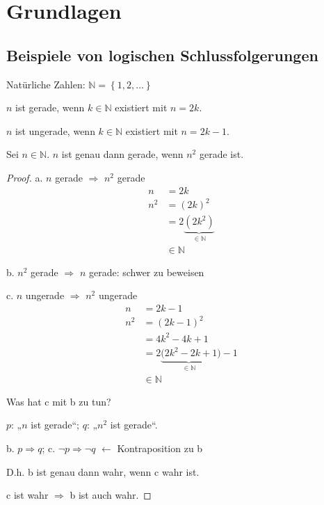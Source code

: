 
\chapter{Grundlagen}
\setcounter{section}{-1}

\section{Beispiele von logischen Schlussfolgerungen}

Natürliche Zahlen: \( \mathbb{N} = \left\{ 1, 2, \dots \right\} \)

$n$ ist gerade, wenn $k \in \mathbb{N}$ existiert mit $n = 2k$.

$n$ ist ungerade, wenn $k \in \mathbb{N}$ existiert mit $n = 2k-1$.

\begin{theorem}
  Sei $n \in \mathbb{N}$. $n$ ist genau dann gerade, wenn $n^2$ gerade ist.
\end{theorem}

\begin{proof}
  a. $n$ gerade $\Rightarrow$ $n^2$ gerade
  \begin{align*}
    n &= 2k \\
    n^2 &= (2k)^2 \\
    \, &= 2\underbrace{(2k^2)}_{\in \mathbb{N}} \\
    \, &\in \mathbb{N}
  \end{align*}

  b. $n^2$ gerade $\Rightarrow$ $n$ gerade: schwer zu beweisen

  c. $n$ ungerade $\Rightarrow$ $n^2$ ungerade
  \begin{align*}
    n &= 2k-1 \\
    n^2 &= (2k-1)^2 \\
    \, &= 4k^2-4k+1 \\
    \, &= 2\underbrace{(2k^2-2k+1}_{\in \mathbb{N}})-1 \\
    \, &\in \mathbb{N}
  \end{align*}

  Was hat c mit b zu tun?

  $p$: „$n$ ist gerade“; $q$: „$n^2$ ist gerade“.

  b. $p \Rightarrow q$; c. $\neg p \Rightarrow \neg q$ $\leftarrow$ Kontraposition zu b

  D.h. b ist genau dann wahr, wenn c wahr ist.

  c ist wahr $\Rightarrow$ b ist auch wahr.
\end{proof}

